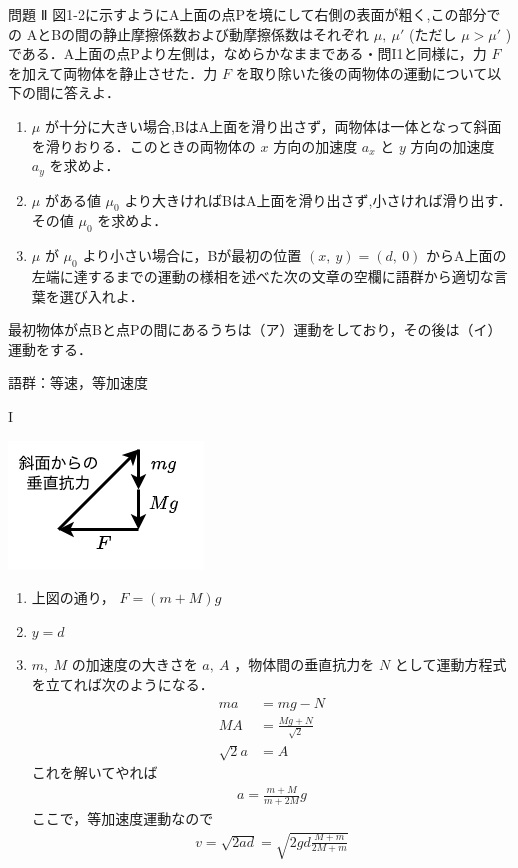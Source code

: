 \documentclass[
  b4paperpaper,
  xelatex,ja=standard]{bxjsbook}
\providecommand{\tightlist}{%
  \setlength{\itemsep}{0pt}\setlength{\parskip}{0pt}}\usepackage{longtable,booktabs,array}
\begin{document}
\begin{Qbox}{問題}
Ⅱ 図1-2に示すようにA上面の点Pを境にして右側の表面が粗く,この部分での
AとBの間の静止摩擦係数および動摩擦係数はそれぞれ \(\mu,\:\mu'\) (ただし
\(\mu > \mu'\) )
である．A上面の点Pより左側は，なめらかなままである・問I1と同様に，力
\(F\) を加えて両物体を静止させた．力 \(F\)
を取り除いた後の両物体の運動について以下の間に答えよ．

\begin{enumerate}
\def\labelenumi{\arabic{enumi}.}
\tightlist
\item
  \(\mu\)
  が十分に大きい場合,BはA上面を滑り出さず，両物体は一体となって斜面を滑りおりる．このときの両物体の
  \(x\) 方向の加速度 \(a_x\) と \(y\) 方向の加速度 \(a_y\) を求めよ．
\item
  \(\mu\) がある値 \(\mu_0\)
  より大きければBはA上面を滑り出さず,小さければ滑り出す．その値
  \(\mu_0\) を求めよ．
\item
  \(\mu\) が \(\mu_0\) より小さい場合に，Bが最初の位置
  \((x,\:y)=(d,\:0)\)
  からA上面の左端に達するまでの運動の様相を述べた次の文章の空欄に語群から適切な言葉を選び入れよ．
\end{enumerate}

最初物体が点Bと点Pの間にあるうちは（ア）運動をしており，その後は（イ）運動をする．

語群：等速，等加速度

\end{Qbox}


I

\includegraphics{source/images/newton/newton24.png}

\begin{enumerate}
\def\labelenumi{\arabic{enumi}.}
\tightlist
\item
  上図の通り， \(F=(m+M)g\)
\item
  \(y=d\)
\item
  \(m,\:M\) の加速度の大きさを \(a,\:A\) ，物体間の垂直抗力を \(N\)
  として運動方程式を立てれば次のようになる． \begin{align*}
  ma&=mg-N\\
  MA&=\frac{Mg+N}{\sqrt{2}}\\
  \sqrt{2}a&=A
  \end{align*} これを解いてやれば \begin{align*}
  a=\frac{m+M}{m+2M}g
  \end{align*} ここで，等加速度運動なので \begin{align*}
  v=\sqrt{2ad}=\sqrt{2gd\frac{M+m}{2M+m}}
  \end{align*}
\end{enumerate}
\end{document}
